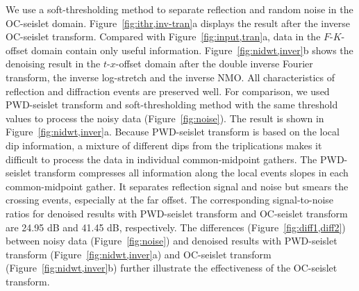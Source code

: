  We use a soft-thresholding method to separate reflection and random
 noise in the OC-seislet domain. Figure~\ref{fig:ithr,inv-tran}a
 displays the result after the inverse OC-seislet transform. Compared
 with Figure~\ref{fig:input,tran}a, data in the $F$-$K$-offset domain
 contain only useful information. Figure~\ref{fig:nidwt,inver}b shows
 the denoising result in the $t$-$x$-offset domain after the double
 inverse Fourier transform, the inverse log-stretch and the inverse
 NMO. All characteristics of reflection and diffraction events are
 preserved well. For comparison, we used PWD-seislet transform and
 soft-thresholding method with the same threshold values to process
 the noisy data (Figure~\ref{fig:noise}). The result is shown in
 Figure~\ref{fig:nidwt,inver}a. Because PWD-seislet transform is based
 on the local dip information, a mixture of different dips from the
 triplications makes it difficult to process the data in individual
 common-midpoint gathers. The PWD-seislet transform compresses all
 information along the local events slopes in each common-midpoint
 gather. It separates reflection signal and noise but smears the
 crossing events, especially at the far offset. The corresponding
 signal-to-noise ratios for denoised results with PWD-seislet
 transform and OC-seislet transform are 24.95 dB and 41.45 dB,
 respectively. The differences (Figure~\ref{fig:diff1,diff2}) between
 noisy data (Figure~\ref{fig:noise}) and denoised results with
 PWD-seislet transform (Figure~\ref{fig:nidwt,inver}a) and OC-seislet
 transform (Figure~\ref{fig:nidwt,inver}b) further
 illustrate the effectiveness of the OC-seislet
 transform.







